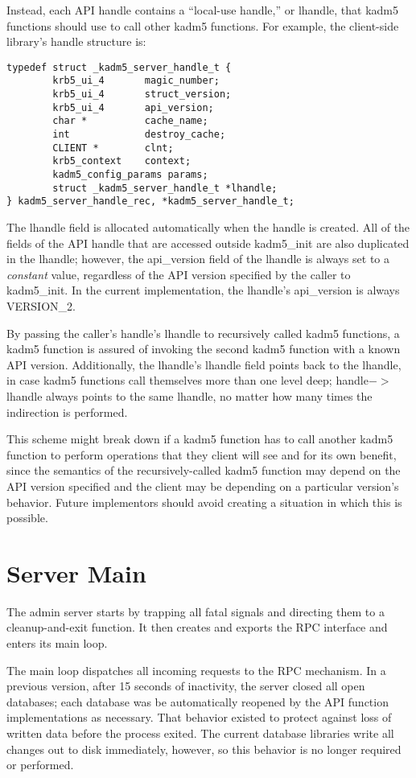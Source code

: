 Instead, each API handle contains a ``local-use handle,'' or lhandle,
that kadm5 functions should use to call other kadm5 functions.  For
example, the client-side library's handle structure is:
%
\begin{verbatim}
typedef struct _kadm5_server_handle_t {
        krb5_ui_4       magic_number;
        krb5_ui_4       struct_version;
        krb5_ui_4       api_version;
        char *          cache_name;
        int             destroy_cache;
        CLIENT *        clnt;
        krb5_context    context;
        kadm5_config_params params;
        struct _kadm5_server_handle_t *lhandle;
} kadm5_server_handle_rec, *kadm5_server_handle_t;
\end{verbatim}
%
The lhandle field is allocated automatically when the handle is
created.  All of the fields of the API handle that are accessed
outside kadm5_init are also duplicated in the lhandle; however, the
api_version field of the lhandle is always set to a {\it constant}
value, regardless of the API version specified by the caller to
kadm5_init.  In the current implementation, the lhandle's api_version
is always VERSION_2.

By passing the caller's handle's lhandle to recursively called kadm5
functions, a kadm5 function is assured of invoking the second kadm5
function with a known API version.  Additionally, the lhandle's
lhandle field points back to the lhandle, in case kadm5 functions call
themselves more than one level deep; handle$->$lhandle always points
to the same lhandle, no matter how many times the indirection is
performed.

This scheme might break down if a kadm5 function has to call another
kadm5 function to perform operations that they client will see and for
its own benefit, since the semantics of the recursively-called kadm5
function may depend on the API version specified and the client may be
depending on a particular version's behavior.  Future implementors
should avoid creating a situation in which this is possible.

\section{Server Main}

The admin server starts by trapping all fatal signals and directing
them to a cleanup-and-exit function.  It then creates and exports the
RPC interface and enters its main loop.

The main loop dispatches all incoming requests to the RPC mechanism.
In a previous version, after 15 seconds of inactivity, the server
closed all open databases; each database was be automatically reopened
by the API function implementations as necessary.  That behavior
existed to protect against loss of written data before the process
exited.  The current database libraries write all changes out to disk
immediately, however, so this behavior is no longer required or
performed.

